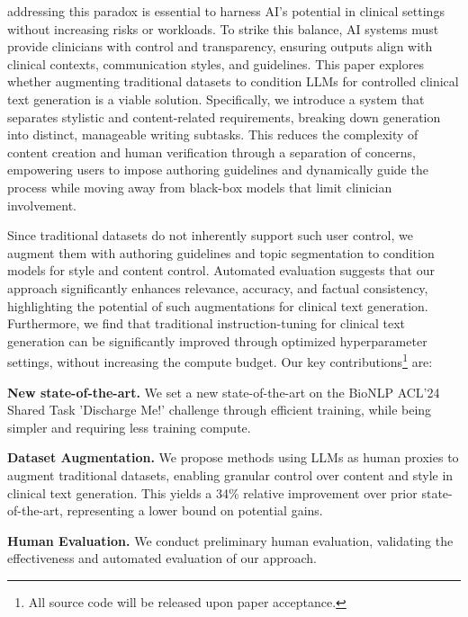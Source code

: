 addressing this paradox is essential to harness AI's potential in clinical settings without increasing risks or workloads. To strike this balance, AI systems must provide clinicians with control and transparency, ensuring outputs align with clinical contexts, communication styles, and guidelines. This paper explores whether augmenting traditional datasets to condition LLMs for controlled clinical text generation is a viable solution. Specifically, we introduce a system that separates stylistic and content-related requirements, breaking down generation into distinct, manageable writing subtasks. This reduces the complexity of content creation and human verification through a separation of concerns, empowering users to impose authoring guidelines and dynamically guide the process while moving away from black-box models that limit clinician involvement. 

Since traditional datasets do not inherently support such user control, we augment them with authoring guidelines and topic segmentation to condition models for style and content control. Automated evaluation suggests that our approach significantly enhances relevance, accuracy, and factual consistency, highlighting the potential of such augmentations for clinical text generation. Furthermore, we find that traditional instruction-tuning for clinical text generation can be significantly improved through optimized hyperparameter settings, without increasing the compute budget.  Our key contributions\footnote{All source code will be released upon paper acceptance.} are: 

\textbf{New state-of-the-art.} We set a new state-of-the-art on the BioNLP ACL'24 Shared Task 'Discharge Me!' challenge through efficient training, while being simpler and requiring less training compute. 

\textbf{Dataset Augmentation.} We propose methods using LLMs as human proxies to augment traditional datasets, enabling granular control over content and style in clinical text generation. This yields a 34\% relative improvement over prior state-of-the-art, representing a lower bound on potential gains.


\textbf{Human Evaluation.} We conduct preliminary human evaluation, validating the effectiveness and automated evaluation of our approach.